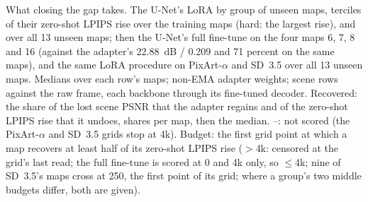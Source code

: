 \begin{table}[tb]
\centering\footnotesize
\caption{What closing the gap takes. The U-Net's LoRA by group of unseen maps, terciles of their zero-shot LPIPS rise over the training maps (hard: the largest rise), and over all 13 unseen maps; then the U-Net's full fine-tune on the four maps 6, 7, 8 and 16 (against the adapter's 22.88~dB / 0.209 and 71 percent on the same maps), and the same LoRA procedure on PixArt-$\alpha$ and SD~3.5 over all 13 unseen maps. Medians over each row's maps; non-EMA adapter weights; scene rows against the raw frame, each backbone through its fine-tuned decoder. Recovered: the share of the lost scene PSNR that the adapter regains and of the zero-shot LPIPS rise that it undoes, shares per map, then the median. --: not scored (the PixArt-$\alpha$ and SD~3.5 grids stop at 4k). Budget: the first grid point at which a map recovers at least half of its zero-shot LPIPS rise (${>}$4k: censored at the grid's last read; the full fine-tune is scored at 0 and 4k only, so ${\le}$4k; nine of SD~3.5's maps cross at 250, the first point of its grid; where a group's two middle budgets differ, both are given).}
\label{tab:cost}
{\scriptsize\setlength{\tabcolsep}{2.5pt}}
\end{table}
